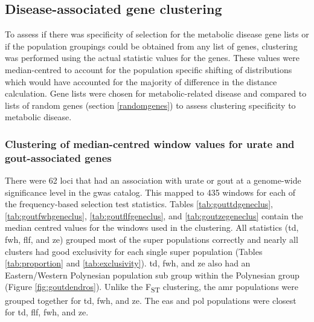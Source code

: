 \documentclass[]{report}
\begin{document}
\subsection{Disease-associated gene clustering}\label{genelistcluster}

To assess if there was specificity of selection for the metabolic
disease gene lists or if the population groupings could be obtained from
any list of genes, clustering was performed using the actual statistic
values for the genes. These values were median-centred to account for
the population specific shifting of distributions which would have
accounted for the majority of difference in the distance calculation.
Gene lists were chosen for metabolic-related disease and compared to
lists of random genes (section \ref{randomgenes}) to assess clustering
specificity to metabolic disease.

\subsubsection{Clustering of median-centred window values for urate and
gout-associated
genes}\label{clustering-of-median-centred-window-values-for-urate-and-gout-associated-genes}

There were 62 loci that had an association with urate or gout at a
genome-wide significance level in the \gls{gwas} catalog. This mapped to
435 windows for each of the frequency-based selection test statistics.
Tables \ref{tab:gouttdgeneclus}, \ref{tab:goutfwhgeneclus},
\ref{tab:goutflfgeneclus}, and \ref{tab:goutzegeneclus} contain the
median centred values for the windows used in the clustering. All
statistics (\gls{td}, \gls{fwh}, \gls{flf}, and \gls{ze}) grouped most
of the super populations correctly and nearly all clusters had good
exclusivity for each single super population (Tables
\ref{tab:proportion} and \ref{tab:exclusivity}). \Gls{td}, \gls{fwh},
and \gls{ze} also had an Eastern/Western Polynesian population sub group
within the Polynesian group (Figure \ref{fig:goutdendros}). Unlike the
F\textsubscript{ST} clustering, the \gls{amr} populations were grouped
together for \gls{td}, \gls{fwh}, and \gls{ze}. The \gls{eas} and
\gls{pol} populations were closest for \gls{td}, \gls{flf}, \gls{fwh},
and \gls{ze}.
\end{document}
